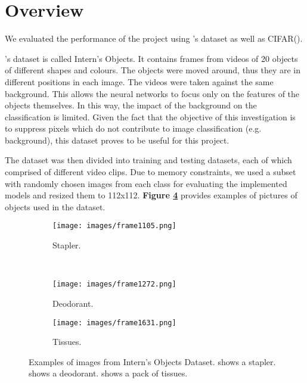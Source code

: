 \documentclass{l4proj}
\begin{document}
\section{Overview}
We evaluated the performance of the project using \cite{Samagaio}'s dataset as well as CIFAR(\cite{CIFAR}). 

\cite{Samagaio}'s dataset is called Intern's Objects. It contains frames from videos of 20 objects of different shapes and colours. The objects were moved around, thus they are in different positions in each image.
The videos were taken against the same background. This allows the neural networks to focus only on the features of the objects themselves. In this way, the impact of the background on the classification is limited. Given the fact that the objective of this investigation is to suppress pixels which do not contribute to image classification (e.g. background), this dataset proves to be useful for this project.

The dataset was then divided into training and testing datasets, each of which comprised of different video clips. Due to memory constraints, we used a subset with randomly chosen images from each class for evaluating the implemented models and resized them to 112x112. \textbf{Figure \textbf{\ref{fig:alvaroexamples}}} provides examples of pictures of objects used in the dataset.

\begin{figure}
    \centering
    \begin{subfigure}[b]{0.3\textwidth}
        \texttt{[image: images/frame1105.png]}
        \caption{Stapler.}
        \label{fig:img1}
    \end{subfigure}
    ~ %
    \begin{subfigure}[b]{0.3\textwidth}
        \texttt{[image: images/frame1272.png]}
        \caption{Deodorant.}
        \label{fig:img2}
    \end{subfigure}
    \begin{subfigure}[b]{0.3\textwidth}
        \texttt{[image: images/frame1631.png]}
        \caption{Tissues.}
        \label{fig:img3}
    \end{subfigure}
    \caption{Examples of images from Intern's Objects Dataset.  shows a stapler.  shows a deodorant.  shows a pack of tissues.
    }\label{fig:alvaroexamples}
\end{figure}
\end{document}
